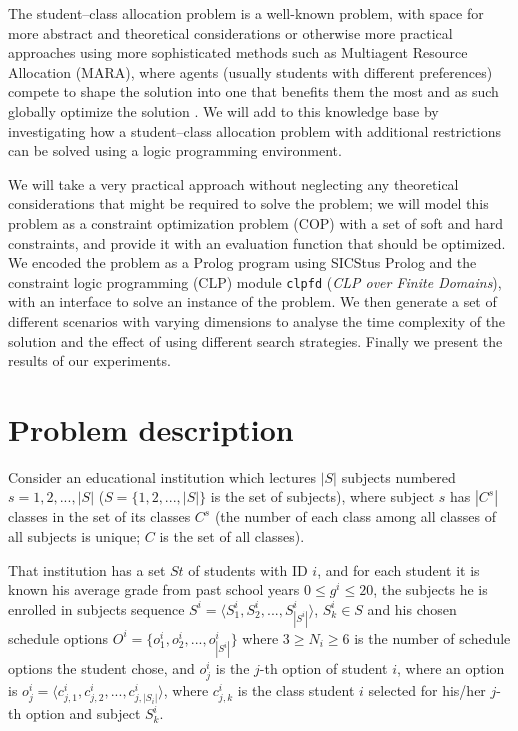 \documentclass[runningheads]{llncs}
\begin{document}
The student--class allocation problem is a well-known problem, with space for more abstract and theoretical considerations \cite{abraham07} or otherwise more practical approaches using more sophisticated methods such as Multiagent Resource Allocation (MARA), where agents (usually students with different preferences) compete to shape the solution into one that benefits them the most and as such globally optimize the solution \cite{cano09}. We will add to this knowledge base by investigating how a student--class allocation problem with additional restrictions can be solved using a logic programming environment.

We will take a very practical approach without neglecting any theoretical considerations that might be required to solve the problem; we will model this problem as a constraint optimization problem (COP) with a set of soft and hard constraints, and provide it with an evaluation function that should be optimized.
We encoded the problem as a Prolog program using SICStus Prolog \cite{sicstus} and the constraint logic programming (CLP) module \texttt{clpfd} (\textit{CLP over Finite Domains}), with an interface to solve an instance of the problem.
We then generate a set of different scenarios with varying dimensions to analyse the time complexity of the solution and the effect of using different search strategies.
Finally we present the results of our experiments.

\section{Problem description}

Consider an educational institution which lectures $|S|$ subjects numbered $s=1, 2, ... , |S|$ ($S = \{1, 2, ..., |S|\}$ is the set of subjects), where subject $s$ has $|C^s|$ classes in the set of its classes $C^s$ (the number of each class among all classes of all subjects is unique; $C$ is the set of all classes).

That institution has a set $St$ of students with ID $i$, and for each student it is known his average grade from past school years $0 \leq g^i \leq 20$, the subjects he is enrolled in subjects sequence $S^i = \langle S^i_1, S^i_2, ..., S^i_{|S^i|} \rangle$, $S^i_k \in S$ and his chosen schedule options $O^i = \{o^i_1, o^i_2, ..., o^i_{|S^i|}\}$ where $3 \geq N_i \geq 6$ is the number of schedule options the student chose, and $o^i_j$ is the $j$-th option of student $i$, where an option is $o^i_j = \langle c^i_{j, 1}, c^i_{j, 2}, ..., {c^i_{j, |S_i|}} \rangle$, where $c^i_{j,k}$ is the class student $i$ selected for his/her $j$-th option and subject $S^i_k$.
\end{document}
